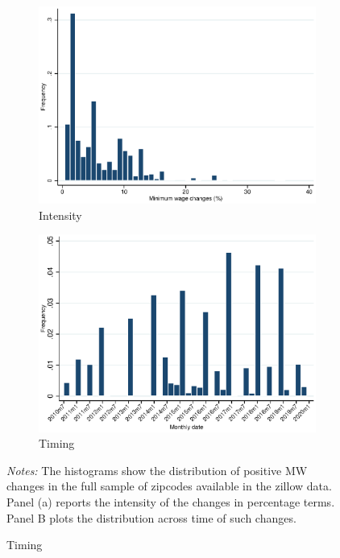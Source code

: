 \begin{figure}[h!]
	\centering
	\caption{Distribution of Minimum Wage changes}
	\label{fig:d_ln_mw_dist}
	\begin{subfigure}{.49\textwidth}
		\caption{Intensity}
		\includegraphics[width = \textwidth]
			{../../analysis/descriptive/output/pct_ch_mw_dist.eps}
	\end{subfigure}
	\begin{subfigure}{.49\textwidth}
		\caption{Timing}
		\includegraphics[width = \textwidth]
			{../../analysis/descriptive/output/pct_ch_mw_date_dist.eps}
	\end{subfigure}
	\begin{minipage}{\textwidth} \footnotesize
		\textit{Notes:} The histograms show the distribution of positive MW changes 
		in the full sample of zipcodes available in the zillow data. Panel (a) reports 
		the intensity of the changes in percentage terms. Panel B plots the distribution 
		across time of such changes. 
	\end{minipage}
\end{figure}


